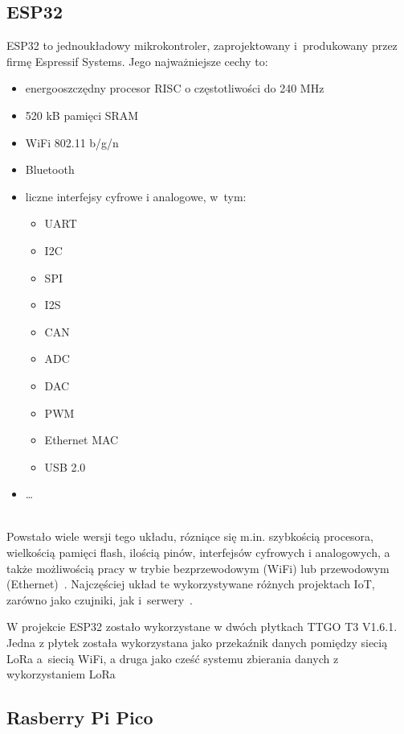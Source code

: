 \subsection{ESP32}
ESP32 to jednoukładowy mikrokontroler, zaprojektowany i~produkowany przez firmę Espressif Systems.
Jego najważniejsze cechy to:
\begin{itemize}
    \item energooszczędny procesor RISC o częstotliwości do 240 MHz
    \item 520 kB pamięci SRAM
    \item WiFi 802.11 b/g/n
    \item Bluetooth
    \item liczne interfejsy cyfrowe i analogowe, w~tym:
          \begin{itemize}
              \item UART
              \item I2C
              \item SPI
              \item I2S
              \item CAN
              \item ADC
              \item DAC
              \item PWM
              \item Ethernet MAC
              \item USB 2.0
          \end{itemize}
    \item \dots
\end{itemize} \cite{ESP32:datasheet} \\
Powstało wiele wersji tego układu, rózniące się m.in. szybkością procesora, wielkością pamięci flash, ilością pinów, interfejsów cyfrowych i analogowych, a także możliwością pracy w trybie bezprzewodowym (WiFi) lub przewodowym (Ethernet)~\cite{ESP32:socs}.
Najczęściej układ te wykorzystywane różnych projektach IoT, zarówno jako czujniki, jak i~serwery~\cite{ESP32:datasheet}.


W projekcie ESP32 zostało wykorzystane w dwóch płytkach TTGO T3 V1.6.1. Jedna z płytek została wykorzystana jako przekaźnik danych pomiędzy siecią LoRa a~siecią WiFi, a druga jako cześć systemu zbierania danych z wykorzystaniem LoRa


\subsection{Rasberry Pi Pico}

